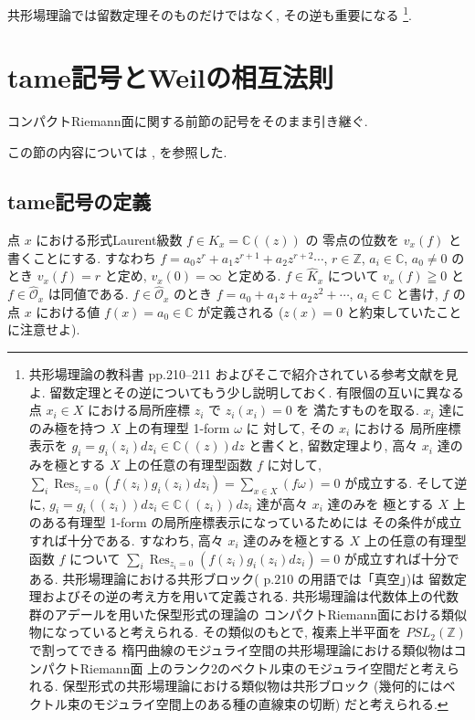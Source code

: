 \documentclass[12pt,twoside]{jarticle}
\newcommand\Z{{\mathbb Z}} %
\newcommand\C{{\mathbb C}} %
\theoremstyle{definition} %
\theoremstyle{definition} %
\theoremstyle{definition} %
\numberwithin{theorem}{section}
\numberwithin{equation}{section}
\numberwithin{figure}{section}
\numberwithin{table}{section}
\newcommand\Res{\mathop{\mathrm{Res}}\nolimits}
\newcommand\Khat{{\widehat K}}
\newcommand\OO{{\mathcal O}}
\newcommand\Ohat{{\widehat \OO}}
\begin{document}
共形場理論では留数定理そのものだけではなく, その逆も重要になる%
\footnote{共形場理論の教科書 \cite{yamada} pp.210--211
およびそこで紹介されている参考文献を見よ.
留数定理とその逆についてもう少し説明しておく.
有限個の互いに異なる点 $x_i\in X$ における局所座標 $z_i$ で $z_i(x_i)=0$ を
満たすものを取る. $x_i$ 達にのみ極を持つ $X$ 上の有理型 1-form $\omega$ に
対して, その $x_i$ における
局所座標表示を $g_i=g_i(z_i)dz_i\in\C((z))dz$ と書くと,
留数定理より, 高々 $x_i$ 達のみを極とする $X$ 上の任意の有理型函数 $f$ に対して,
$\sum_i\Res_{z_i=0}(f(z_i)g_i(z_i)dz_i)=\sum_{x\in X}(f\omega)=0$ が成立する.
そして逆に, $g_i=g_i((z_i))dz_i\in\C((z_i))dz_i$ 達が高々 $x_i$ 達のみを
極とする $X$ 上のある有理型 1-form の局所座標表示になっているためには
その条件が成立すれば十分である.
すなわち, 高々 $x_i$ 達のみを極とする $X$ 上の任意の有理型函数 $f$ について
$\sum_i\Res_{z_i=0}(f(z_i)g_i(z_i)dz_i)=0$ が成立すれば十分である.
共形場理論における共形ブロック(\cite{yamada} p.210 の用語では「真空」)は
留数定理およびその逆の考え方を用いて定義される.
共形場理論は代数体上の代数群のアデールを用いた保型形式の理論の
コンパクトRiemann面における類似物になっていると考えられる.
その類似のもとで, 複素上半平面を $PSL_2(\Z)$ で割ってできる
楕円曲線のモジュライ空間の共形場理論における類似物はコンパクトRiemann面
上のランク2のベクトル束のモジュライ空間だと考えられる.
保型形式の共形場理論における類似物は共形ブロック
(幾何的にはベクトル束のモジュライ空間上のある種の直線束の切断)
だと考えられる.
}.


\section{tame記号とWeilの相互法則}

コンパクトRiemann面に関する前節の記号をそのまま引き継ぐ.

この節の内容については \cite{deligne}, \cite{kerr} を参照した.


\subsection{tame記号の定義}

点 $x$ における形式Laurent級数 $f\in\Khat_x=\C((z))$ の
零点の位数を $v_x(f)$ と書くことにする.
すなわち $f=a_0 z^r+a_1 z^{r+1}+a_2 z^{r+2}\cdots$,
$r\in\Z$, $a_i\in\C$, $a_0\ne 0$ のとき $v_x(f)=r$ と定め,
$v_x(0)=\infty$ と定める.
$f\in\Khat_x$ について $v_x(f)\geqq 0$ と $f\in\Ohat_x$ は同値である.
$f\in\Ohat_x$ のとき $f=a_0+a_1 z+ a_2 z^2+\cdots$, $a_i\in\C$ と書け,
$f$ の点 $x$ における値 $f(x)=a_0\in\C$ が定義される
($z(x)=0$ と約束していたことに注意せよ).
\end{document}
